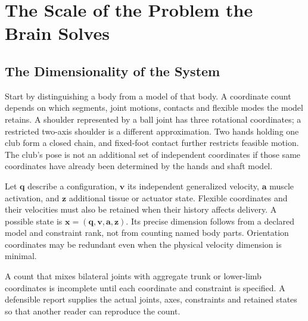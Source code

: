 \section{The Scale of the Problem the Brain Solves}
\label{sec:ch26_scale}

\subsection{The Dimensionality of the System}
\label{subsec:ch26_dimensionality}

Start by distinguishing a body from a model of that body. A coordinate count depends on which segments, joint motions, contacts and flexible modes the model retains. A shoulder represented by a ball joint has three rotational coordinates; a restricted two-axis shoulder is a different approximation. Two hands holding one club form a closed chain, and fixed-foot contact further restricts feasible motion. The club's pose is not an additional set of independent coordinates if those same coordinates have already been determined by the hands and shaft model.

Let $\bm q$ describe a configuration, $\bm v$ its independent generalized velocity, $\bm a$ muscle activation, and $\bm z$ additional tissue or actuator state. Flexible coordinates and their velocities must also be retained when their history affects delivery. A possible state is $\bm x=(\bm q,\bm v,\bm a,\bm z)$. Its precise dimension follows from a declared model and constraint rank, not from counting named body parts. Orientation coordinates may be redundant even when the physical velocity dimension is minimal.

A count that mixes bilateral joints with aggregate trunk or lower-limb coordinates is incomplete until each coordinate and constraint is specified. A defensible report supplies the actual joints, axes, constraints and retained states so that another reader can reproduce the count.

